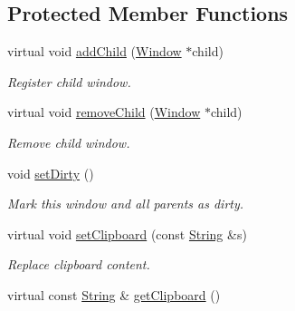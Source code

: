 \subsection*{Protected Member Functions}
\begin{DoxyCompactItemize}
\item 
\hypertarget{classGUI_1_1Window_a861322fa034eb21b9cf7f0ed59413ed5}{virtual void \hyperlink{classGUI_1_1Window_a861322fa034eb21b9cf7f0ed59413ed5}{add\-Child} (\hyperlink{classGUI_1_1Window}{Window} $\ast$child)}\label{classGUI_1_1Window_a861322fa034eb21b9cf7f0ed59413ed5}

\begin{DoxyCompactList}\small\item\em Register child window. \end{DoxyCompactList}\item 
\hypertarget{classGUI_1_1Window_ab851b8d9becc893409eb9faf31c2317d}{virtual void \hyperlink{classGUI_1_1Window_ab851b8d9becc893409eb9faf31c2317d}{remove\-Child} (\hyperlink{classGUI_1_1Window}{Window} $\ast$child)}\label{classGUI_1_1Window_ab851b8d9becc893409eb9faf31c2317d}

\begin{DoxyCompactList}\small\item\em Remove child window. \end{DoxyCompactList}\item 
\hypertarget{classGUI_1_1Window_abc34c384fe864d8515f540b427f36dd2}{void \hyperlink{classGUI_1_1Window_abc34c384fe864d8515f540b427f36dd2}{set\-Dirty} ()}\label{classGUI_1_1Window_abc34c384fe864d8515f540b427f36dd2}

\begin{DoxyCompactList}\small\item\em Mark this window and all parents as dirty. \end{DoxyCompactList}\item 
\hypertarget{classGUI_1_1Window_a443e9dc8d2ba7bcf337cea030ccd06f7}{virtual void \hyperlink{classGUI_1_1Window_a443e9dc8d2ba7bcf337cea030ccd06f7}{set\-Clipboard} (const \hyperlink{classGUI_1_1String}{String} \&s)}\label{classGUI_1_1Window_a443e9dc8d2ba7bcf337cea030ccd06f7}

\begin{DoxyCompactList}\small\item\em Replace clipboard content. \end{DoxyCompactList}\item 
\hypertarget{classGUI_1_1Window_a56e15176c8d69eff86b7d2479ff52c26}{virtual const \hyperlink{classGUI_1_1String}{String} \& \hyperlink{classGUI_1_1Window_a56e15176c8d69eff86b7d2479ff52c26}{get\-Clipboard} ()}\label{classGUI_1_1Window_a56e15176c8d69eff86b7d2479ff52c26}


\end{DoxyCompactItemize}
